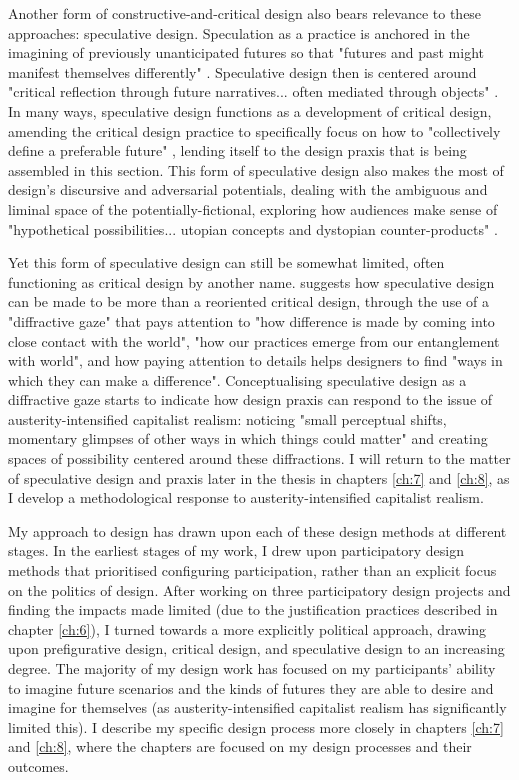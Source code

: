 Another form of constructive-and-critical design also bears relevance to these approaches: speculative design. Speculation as a practice is anchored in the imagining of previously unanticipated futures so that "futures and past might manifest themselves differently" \citep{gatehouse_hauntology_2020}. Speculative design then is centered around "critical reflection through future narratives... often mediated through objects" \citep{forlano_ethnographies_2013}. In many ways, speculative design functions as a development of critical design, amending the critical design practice to specifically focus on how to "collectively define a preferable future" \cite[6]{dunne_speculative_2013}, lending itself to the design praxis that is being assembled in this section. This form of speculative design also makes the most of design's discursive and adversarial potentials, dealing with the ambiguous and liminal space of the potentially-fictional, exploring how audiences make sense of "hypothetical possibilities... utopian concepts and dystopian counter-products" \citep{auger_speculative_2013}.

Yet this form of speculative design can still be somewhat limited, often functioning as critical design by another name. \citet{gatehouse_speculative_2020} suggests how speculative design can be made to be more than a reoriented critical design, through the use of a "diffractive gaze" that pays attention to "how difference is made by coming into close contact with the world", "how our practices emerge from our entanglement with world", and how paying attention to details helps designers to find "ways in which they can make a difference". Conceptualising speculative design as a diffractive gaze starts to indicate how design praxis can respond to the issue of austerity-intensified capitalist realism: noticing "small perceptual shifts, momentary glimpses of other ways in which things could matter" and creating spaces of possibility centered around these diffractions. I will return to the matter of speculative design and praxis later in the thesis in chapters \ref{ch:7} and \ref{ch:8}, as I develop a methodological response to austerity-intensified capitalist realism. 

My approach to design has drawn upon each of these design methods at different stages. In the earliest stages of my work, I drew upon participatory design methods that prioritised configuring participation, rather than an explicit focus on the politics of design. After working on three participatory design projects and finding the impacts made limited (due to the justification practices described in chapter \ref{ch:6}), I turned towards a more explicitly political approach, drawing upon prefigurative design, critical design, and speculative design to an increasing degree. The majority of my design work has focused on my participants' ability to imagine future scenarios and the kinds of futures they are able to desire and imagine for themselves (as austerity-intensified capitalist realism has significantly limited this). I describe my specific design process more closely in chapters \ref{ch:7} and \ref{ch:8}, where the chapters are focused on my design processes and their outcomes.
